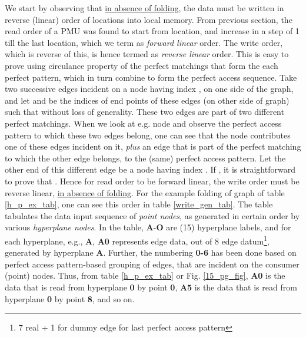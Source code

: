 \documentclass[12pt]{article}
\begin{document}
We start by observing that \uline{in absence of folding}, the data must be
written in reverse (linear) order of locations into local memory. From
previous section, the read order of a PMU was found to start from
 location, and increase in a step of 1 till the last location,
which we term as \textit{forward linear} order. The write order, which is
reverse of this, is hence termed as \textit{reverse linear} order. This is easy to
prove using circulance property of the perfect matchings that form the
each perfect pattern, which in turn combine to form the perfect access
sequence. Take two successive edges incident on a node having
index , on one side of
the graph, and let  and  be the indices of end points
of these edges (on other side of graph) such that
   without loss of generality. These two edges are part of
two different perfect matchings. When we look at e.g. node  and observe
the perfect access pattern to which these two edges belong, one can see
that the node  contributes one of these edges incident on it, \textit{plus}
an edge that is part of the perfect matching to which the other edge
belongs, to the (same) perfect access pattern. Let the other end of this
different edge be a node having index . If   , it is straightforward to
prove that   . Hence for read order to be forward linear,
the write order must be reverse linear, \uline{in absence of folding}. For
the example folding of graph of table \ref{h_p_ex_tab}, one can see this
order in table \ref{write_gen_tab}. The table tabulates the
data input sequence of \textit{point nodes},
as generated in certain order by various
\textit{hyperplane nodes}. In the table, \textbf{A}-\textbf{O} are
(15) hyperplane labels, and for each hyperplane, e.g.,
\textbf{A},  \textbf{A0} represents  edge data, out of 8 edge
datum\footnote{7 real + 1 for dummy edge for last perfect access
pattern},
generated by hyperplane \textbf{A}. Further, the numbering \textbf{0-6} has
been done based on perfect access pattern-based grouping of edges, that are
incident on the consumer (point) nodes. Thus, from table
\ref{h_p_ex_tab} or Fig. \ref{15_pg_fig}, \textbf{A0} is the data that is
read from hyperplane \textbf{0} by point \textbf{0}, \textbf{A5} is the
data that is read from hyperplane \textbf{0} by point \textbf{8}, and so
on.
\end{document}
